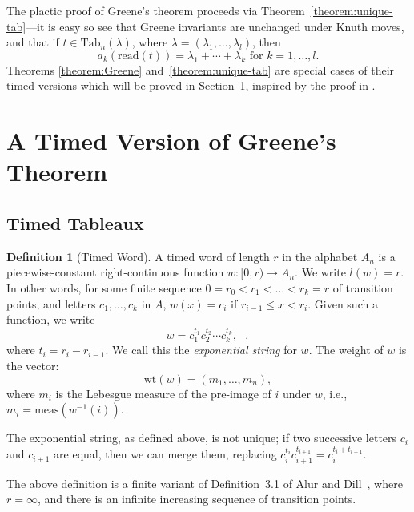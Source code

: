\documentclass[10pt]{amsproc}
\theoremstyle{definition}
\newtheorem{definition}[theorem]{Definition}
\theoremstyle{remark}
\newcommand{\Tab}{\mathrm{Tab}}
\newcommand{\rd}{\mathrm{read}}
\newcommand{\wt}{\mathrm{wt}}
\begin{document}
The plactic proof of Greene's theorem proceeds via Theorem~\ref{theorem:unique-tab}---it is easy so see that Greene invariants are unchanged under Knuth moves, and that if $t\in \Tab_n(\lambda)$, where $\lambda=(\lambda_1,\dotsc,\lambda_l)$, then
\begin{displaymath}
  a_k(\rd(t)) = \lambda_1+\dotsb +\lambda_k\text{ for }k=1,\dotsc,l.
\end{displaymath}
Theorems \ref{theorem:Greene} and~\ref{theorem:unique-tab} are special cases of their timed versions which will be proved in Section~\ref{sec:timed-vers-green}, inspired by the proof in \cite{Lascoux}.
\section{A Timed Version of Greene's Theorem}
\label{sec:timed-vers-green}
\subsection{Timed Tableaux}
\label{sec:timed-tableaux}
\begin{definition}
  [Timed Word]
  \label{definition:timed-word}
  A timed word of length $r$ in the alphabet $A_n$ is a piecewise-constant right-continuous function $w:[0,r)\to A_n$.
  We write $l(w)=r$.
  In other words, for some finite sequence $0=r_0<r_1<\dotsc<r_k=r$ of transition points, and letters $c_1,\dotsc, c_k$ in $A$, $w(x) = c_i$ if $r_{i-1}\leq x < r_i$.
  Given such a function, we write
  \begin{equation}
    \label{eq:exp_not}
    w = c_1^{t_1} c_2^{t_2}\dotsb c_k^{t_k}, \text{ },
  \end{equation}
  where $t_i = r_i-r_{i-1}$.
  We call this the \emph{exponential string} for $w$.
  The weight of $w$ is the vector:
  \begin{displaymath}
    \wt(w) = (m_1,\dotsc,m_n),
  \end{displaymath}
  where $m_i$ is the Lebesgue measure of the pre-image of $i$ under $w$, i.e., $m_i=\mathrm{meas}(w^{-1}(i))$.
\end{definition}
The exponential string, as defined above, is not unique; if two successive letters $c_i$ and $c_{i+1}$ are equal, then we can merge them, replacing $c_i^{t_i}c_{i+1}^{t_{i+1}} = c_i^{t_i+t_{i+1}}$.

The above definition is a finite variant of Definition~3.1 of Alur and Dill~\cite{alur-dill}, where $r=\infty$, and there is an infinite increasing sequence of transition points.
\end{document}
